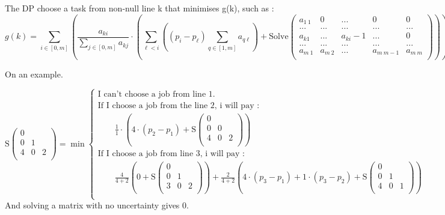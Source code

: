 \documentclass{article}
\begin{document}
The DP choose a task from non-null line k that minimises g(k), such as : $$
g(k) = \sum_{ i \in [0,m] } \left(\frac{a_{ki}}{\sum_{ j \in [0,m] } a_{kj}}\cdot \left(\sum_{\ell<i}\left(\left(p_i-p_\ell\right)\sum_{q\in[1,m]}a_{q\ell}  \right) + \text{Solve} \begin{pmatrix}
            a_{1\ 1} & 0 & ...& 0 & 0\\
            ... & ... & ... & ... & ...\\
			a_{k1} & ... & a_{ki} -1& ... & 0 \\
			... & ... & ... & ... & ...\\
			a_{m\ 1} & a_{m\ 2} & ... & a_{m\ m-1}& a_{m\ m} \\
        \end{pmatrix}\right)\right)
$$

On an example.

$$
\text{S} \begin{pmatrix}
            0 &   &   \\
            0 & 1 &   \\ 
            4 & 0 & 2 \\
        \end{pmatrix} = \min \begin{cases}
        \text{I can't choose a job from line 1.}\\
        \text{If I choose a job from the line 2, i will pay :}\\
            \hspace{2em}\frac{1}{1}\cdot\left(4\cdot\left(p_2-p_1\right)+ \text{S}\begin{pmatrix}0 &   &   \\0 & 0 &   \\ 4 & 0 & 2 \\ \end{pmatrix}\right) \\ 
        \text{If I choose a job from line 3, i will pay :}\\
            \hspace{2em}\frac{4}{4+2}\left(0+\text{S} \begin{pmatrix}
            0 &   &   \\
            0 & 1 &   \\ 
            3 & 0 & 2 \\
        \end{pmatrix}\right) + \frac{2}{4+2}\left(4\cdot\left(p_3-p_1\right)+1\cdot\left(p_3-p_2\right)+\text{S} \begin{pmatrix}
            0 &   &   \\
            0 & 1 &   \\ 
            4 & 0 & 1 \\
        \end{pmatrix}\right) \\
        \end{cases}
$$
And solving a matrix with no uncertainty gives 0.
\end{document}
